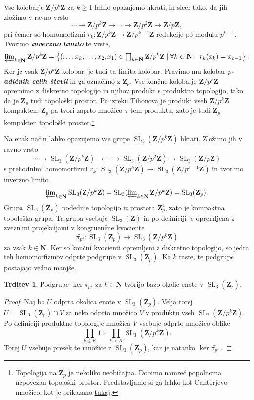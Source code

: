 \documentclass[11pt]{book}
\def\NN{\mathbf{N}}
\def\ZZ{\mathbf{Z}}
\DeclareMathOperator\SL{SL}
\def\definicija{\color{rdeca}\bf\em}
\theoremstyle{definition}
\theoremstyle{zgled}
\theoremstyle{odprtproblem}
\theoremstyle{domacanaloga}
\newenvironment{dokaz}
    {\color{siva}\begin{proof}}
    {\end{proof}}
\theoremstyle{izrek}
\newtheorem*{trditev}{Trditev}
\begin{document}
Vse kolobarje $\ZZ/p^k\ZZ$ za $k \geq 1$ lahko opazujemo hkrati, in sicer tako, da jih zložimo v ravno vrsto
\[
    \cdots \to \ZZ/p^k\ZZ \to \cdots \to \ZZ/p^2\ZZ \to \ZZ/p\ZZ,
\]
pri čemer so homomorfizmi $r_k \colon \ZZ/p^k\ZZ \to \ZZ/p^{k-1}\ZZ$ redukcije po modulu $p^{k-1}$. Tvorimo {\definicija inverzno limito} te vrste,
\[
    \textstyle \varprojlim_{k \in \NN} \ZZ/p^k\ZZ
    = \left\{
        (\dots, x_k, \dots, x_2, x_1) \in \prod_{k \in \NN} \ZZ/p^k\ZZ \mid
        \forall k \in \NN \colon \ r_k(x_k) = x_{k-1}
    \right\}.
\]
Ker je vsak $\ZZ/p^k\ZZ$ kolobar, je tudi ta limita kolobar. Pravimo mu kolobar {\definicija $p$-adičnih celih števil} in ga označimo z $\ZZ_p$. Vse končne kolobarje $\ZZ/p^k\ZZ$ opremimo z diskretno topologijo in njihov produkt s produktno topologijo, tako da je $\ZZ_p$ tudi topološki prostor. Po izreku Tihonova je produkt vseh $\ZZ/p^k\ZZ$ kompakten, $\ZZ_p$ pa tvori zaprto množico v tem produktu, zato je tudi $\ZZ_p$ kompakten topološki prostor.\footnote{Topologija na $\ZZ_p$ je nekoliko neobičajna. Dobimo namreč popolnoma nepovezan topološki prostor. Predstavljamo si ga lahko kot Cantorjevo množico, kot je prikazano \href{https://im.icerm.brown.edu/portfolio/seeing-p-adics/}{tukaj}.}

Na enak način lahko opazujemo vse grupe $\SL_3(\ZZ/p^k\ZZ)$ hkrati. Zložimo jih v ravno vrsto
\[
    \textstyle \cdots \to \SL_3(\ZZ/p^k\ZZ) \to \cdots \to \SL_3(\ZZ/p^2\ZZ) \to \SL_3(\ZZ/p\ZZ)
\]
s prehodnimi homomorfizmi $r_k \colon \SL_3(\ZZ/p^k\ZZ) \to \SL_3(\ZZ/p^{k-1}\ZZ)$ in tvorimo inverzno limito
\[
    \textstyle \varprojlim_{k \in \NN} \SL_3(\ZZ/p^k\ZZ)
    = \SL_3(\varprojlim_{k \in \NN} \ZZ/p^k\ZZ)
    = \SL_3(\ZZ_p).
\]
Grupa $\SL_3(\ZZ_p)$ podeduje topologijo iz prostora $\ZZ_p^4$, zato je kompaktna topološka grupa. Ta grupa vsebuje $\SL_3(\ZZ)$ in po definiciji je opremljena z zveznimi projekcijami v kongruenčne kvociente 
\[
    \textstyle \widetilde{\pi_{p^k}} \colon \SL_3(\ZZ_p) \to \SL_3(\ZZ/p^k\ZZ)
\]
za vsak $k \in \NN$. Ker so končni kvocienti opremljeni z diskretno topologijo, so jedra teh homomorfizmov odprte podgrupe v $\SL_3(\ZZ_p)$. Ko $k$ raste, te podgrupe postajajo vedno manjše.

\begin{trditev}
Podgrupe $\ker \widetilde{\pi_{p^k}}$ za $k \in \NN$ tvorijo bazo okolic enote v $\SL_3(\ZZ_p)$.
\end{trditev}
\begin{dokaz}
Naj bo $U$ odprta okolica enote v $\SL_3(\ZZ_p)$. Velja torej $U = \SL_3(\ZZ_p) \cap V$ za neko odprto množico $V$ v produktu vseh $\SL_3(\ZZ/p^k\ZZ)$. Po definiciji produktne topologije množica $V$ vsebuje odprto množico oblike
\[
    \prod_{k \leq K} 1 \times \prod_{k > K} {\textstyle \SL_3(\ZZ/p^k\ZZ)}.
\]
Torej $U$ vsebuje presek te množice z $\SL_3(\ZZ_p)$, kar je natanko $\ker \widetilde{\pi_{p^K}}$.
\end{dokaz}
\end{document}
